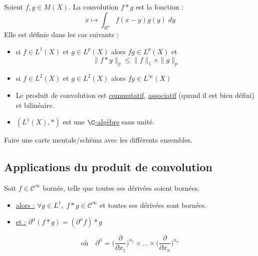\begin{theorem}
    Soient $f,g \in M(X)$. La convolution $f \ast g$ est la fonction :
        \[ x \longmapsto \int_{R^n} f(x-y) g(y) \; dy \] 
    Elle est définie dans les cas suivants :
    \begin{itemize}
        \item si $f \in L^1(X)$ et $g \in L^p(X)$ alors $fg \in L^p(X)$ et 
            \[ \| f \ast g\|_p \leq \|f\|_1 \times \|g\|_p \] 
        \item si $f \in L^2(X)$ et $g \in L^2(X)$ alors $fg \in L^\infty(X)$
    \end{itemize}
\end{theorem}

\begin{prop}
    \begin{itemize}
        \item Le produit de convolution est \underline{commutatif}, \underline{associatif} (quand il est bien défini) et bilinéaire.
        \item $(L^1(X),\ast)$ est une \underline{$\C$-algèbre} sans unité. 
    \end{itemize}
\end{prop}

\begin{example}
    Faire une carte mentale/schéma avec les différents ensembles. 
\end{example}

\newpage 

\subsection{Applications du produit de convolution}

\begin{theorem}[Régularisation]
    Soit $f \in \mathcal{C}^\infty$ bornée, telle que toutes ses dérivées soient bornées. 

    \begin{itemize}
        \item[] \underline{alors :} \quad $ \forall g \in L^1, \; f \ast g \in \mathcal{C}^\infty$ et toutes ses dérivées sont bornées. 
        \item[] \underline{et :} \quad \quad $ \partial^\alpha (f \ast g) = (\partial^\alpha f) \ast g $
    \end{itemize}

    \[ \text{où} \quad \partial^\alpha = \Bigg( \frac{\partial}{\partial {x_1}} \Bigg)^{\alpha_1} \times \dots \times \Bigg( \frac{\partial}{\partial {x_n}} \Bigg)^{\alpha_n} \]
\end{theorem}

